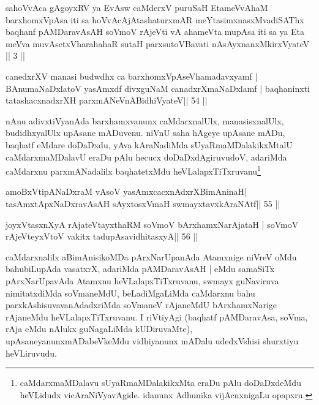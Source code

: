 

\begin{kandikeshl}
sahoVvAca gAgoyxRV ya EvAsw caMderxV puruSaH
EtameVvAhaM barxhomxVpAsa iti 
sa hoVvAcAjAtashaturxmAR meYtasimxnasxMvadiSAThx
baqhanf pAMDaravAsAH soVmoV rAjeVti
vA ahameVta mupAsa iti sa ya Eta meVva
muvAsetxV\s harahahaR sutaH parxsutoVBavati
nAsAyxnanxMkirxVyateV || 3 ||
\end{kandikeshl}


\begin{shl}
canedxrXV manasi budwdhx ca barxhomxVpAseV\s hamadavxyamf |
BAnumaNaDxlatoV yasAmxdf divxguNaM canadxrXmaNaDxlamf |
baqhaninxti tatashacxnadxrXH parxmANeVnABidhiVyateV\hfill || 54 ||
\end{shl}

\begin{artha}
nAnu adivxtiVyanAda barxhamxvanunx caMdarxnalUlx, manasisxnalUlx,  budidhxyalUlx upAsane mADuvenu. niVnU saha hAgeye upAsane mADu,  baqhatf eMdare doDaDxdu, yAva kAraNadiMda sUyaRmaMDalakikxMtalU caMdarxmaMDalavU eraDu pAlu hecucx doDaDxdAgiruvudoV, adariMda caMdarxnu parxmANadalilx baqhatetxMdu heVLalapxTiTxruvanu\footnote{caMdarxmaMDalavu sUyaRmaMDalakikxMta eraDu pAlu doDaDxdeMdu heVLidudx vicAraNiVyavAgide. idanunx Adhunika vijAcnxnigaLu opapxru.}
\end{artha}

\begin{shl}
amoBxV\s tipANaDxraM vAsoV yasAmxcacxnAdxrXBimAninaH|
tasAmxtApxNaDxravAsAH sAyxtosxVmaH swmayxtavxkAraNAtf\hfill || 55 ||
\end{shl}

\begin{shl}
joyxVtasxnXyA rAjateV\s tayxthaRM soVmoV bArxhamxNarAjataH |
soVmoV rAjeVteyxVtoV vakitx tadupAsavidhitasxyA\hfill || 56 ||
\end{shl}

\begin{artha}
caMdarxnalilx aBimAnisikoMDa pArxNarUpanAda Atamxnige niVreV oMdu  bahubiLupAda vasatxrX, adariMda pAMDaravAsAH | eMdu samaSiTx  pArxNarUpavAda Atamxnu heVLalapxTiTxruvanu, swmayx guNaviruva  nimitatxdiMda soVmaneMdU, beLadiMgaLiMda caMdarxnu bahu  parxkAshisuvavanAdadxriMda soVmaneV rAjaneMdU bArxhamxNarige rAjaneMdu heVLalapxTiTxruvanu. I riVtiyAgi (baqhatf pAMDaravAsa, soVma, rAja eMdu nAlukx guNagaLiMda kUDiruvaMte), upAsaneyanunx\break mADabeVkeMdu vidhiyanunx mADalu udedxVshisi shurxtiyu heVLiruvudu.
\end{artha}

